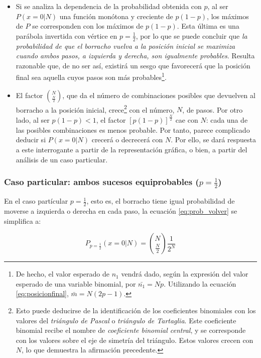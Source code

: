 \begin{itemize}
	\item Si se analiza la dependencia de la probabilidad obtenida con $p$, al ser $P(x=0|N)$ una función monótona y creciente de $p(1-p)$, los máximos de $P$ se corresponden con los máximos de $p(1-p)$. Esta última es una parábola invertida con vértice en $p = \frac{1}{2}$, por lo que se puede concluir que \emph{la probabilidad de que el borracho vuelva a la posición inicial se maximiza cuando ambos pasos, a izquierda y derecha, son igualmente probables}. Resulta razonable que, de no ser así, existirá un sesgo que favorecerá que la posición final sea aquella cuyos pasos son más probables\footnote{De hecho, el valor esperado de $n_1$ vendrá dado, según la expresión del valor esperado de una variable binomial, por $\bar {n_1} = Np$. Utilizando la ecuación \ref{eq:posicionfinal}, $\bar{m} = N (2p-1)$.}.
	\item El factor $\binom{N}{\frac{N}{2}}$, que da el número de combinaciones posibles que devuelven al borracho a la posición inicial, crece\footnote{Esto puede deducirse de la identificación de los coeficientes binomiales con los valores del \textit{triángulo de Pascal} o \textit{triángulo de Tartaglia}. Este coeficiente binomial recibe el nombre de \textit{coeficiente binomial central}, y se corresponde con los valores sobre el eje de simetría del triángulo. Estos valores crecen con $N$, lo que demuestra la afirmación precedente.} con el número, $N$, de pasos. Por otro lado, al ser $p(1-p) < 1$, el factor $[p(1-p)]^{\frac{N}{2}}$ cae con $N$: cada una de las posibles combinaciones es menos probable. Por tanto, parece complicado deducir si $P(x=0|N)$ crecerá o decrecerá con $N$. Por ello, se dará respuesta a este interrogante a partir de la representación gráfica, o bien, a partir del análisis de un caso particular.
\end{itemize}

\subsubsection{Caso particular: ambos sucesos equiprobables ($p = \frac{1}{2}$)}
\label{sec:a_volver_1/2}
En el caso partícular $p = \frac{1}{2}$, esto es, el borracho tiene igual probabilidad de moverse a izquierda o derecha en cada paso, la ecuación \ref{eq:prob_volver} se simplifica a:

\begin{equation}
	P_{p = \frac{1}{2}}(x=0|N)=\binom{N}{\frac{N}{2}}\frac{1}{2^N}
	\label{eq:prob_volver_1/2}
\end{equation}

